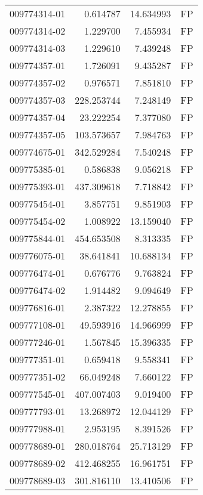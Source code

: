 \begin{tabular}{lrrl}
009774314-01 &    0.614787 &      14.634993 &   FP \\
009774314-02 &    1.229700 &       7.455934 &   FP \\
009774314-03 &    1.229610 &       7.439248 &   FP \\
009774357-01 &    1.726091 &       9.435287 &   FP \\
009774357-02 &    0.976571 &       7.851810 &   FP \\
009774357-03 &  228.253744 &       7.248149 &   FP \\
009774357-04 &   23.222254 &       7.377080 &   FP \\
009774357-05 &  103.573657 &       7.984763 &   FP \\
009774675-01 &  342.529284 &       7.540248 &   FP \\
009775385-01 &    0.586838 &       9.056218 &   FP \\
009775393-01 &  437.309618 &       7.718842 &   FP \\
009775454-01 &    3.857751 &       9.851903 &   FP \\
009775454-02 &    1.008922 &      13.159040 &   FP \\
009775844-01 &  454.653508 &       8.313335 &   FP \\
009776075-01 &   38.641841 &      10.688134 &   FP \\
009776474-01 &    0.676776 &       9.763824 &   FP \\
009776474-02 &    1.914482 &       9.094649 &   FP \\
009776816-01 &    2.387322 &      12.278855 &   FP \\
009777108-01 &   49.593916 &      14.966999 &   FP \\
009777246-01 &    1.567845 &      15.396335 &   FP \\
009777351-01 &    0.659418 &       9.558341 &   FP \\
009777351-02 &   66.049248 &       7.660122 &   FP \\
009777545-01 &  407.007403 &       9.019400 &   FP \\
009777793-01 &   13.268972 &      12.044129 &   FP \\
009777988-01 &    2.953195 &       8.391526 &   FP \\
009778689-01 &  280.018764 &      25.713129 &   FP \\
009778689-02 &  412.468255 &      16.961751 &   FP \\
009778689-03 &  301.816110 &      13.410506 &   FP \\

\end{tabular}

